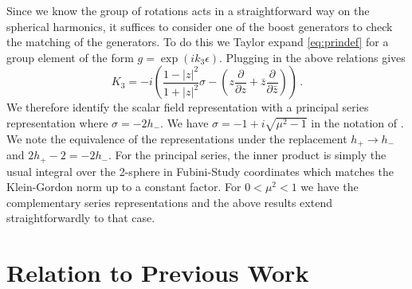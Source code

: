 \documentclass{brownthesis}
\begin{document}
Since we know the group of rotations acts in a straightforward way
on the spherical harmonics, it suffices to consider one of the boost
generators to check the matching of the generators. To do this we
Taylor expand \eqref{eq:prindef} for a group element of the form
$g=\exp(ik_{3}\epsilon)$. Plugging in the above relations gives
\[
K_{3}=-i\left(\frac{1-|z|^{2}}{1+|z|^{2}}\sigma-\left(z\frac{\partial}{\partial z}+\bar{z}\frac{\partial}{\partial\bar{z}}\right)\right)\,.
\]
We therefore identify the scalar field representation with a principal
series representation where $\sigma=-2h_{-}$. We have $\sigma=-1+i\sqrt{\mu^{2}-1}$
in the notation of \cite{vilenkin1992representation}. We note the
equivalence of the representations under the replacement $h_{+}\to h_{-}$
and $2h_{+}-2=-2h_{-}$. For the principal series, the inner product
is simply the usual integral over the 2-sphere in Fubini-Study coordinates
which matches the Klein-Gordon norm up to a constant factor. For $0<\mu^{2}<1$
we have the complementary series representations and the above results
extend straightforwardly to that case.

\section{Relation to Previous Work}

\label{sec:psrep}
\end{document}
